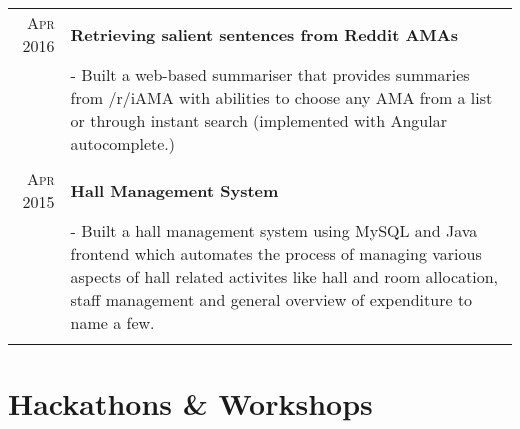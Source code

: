 \documentclass[a4paper,10pt]{extarticle} %
\begin{document}
\begin{tabular}{r|p{17cm}}
\textsc{Apr 2016} & \textbf{Retrieving salient sentences from Reddit AMAs} \\
& \footnotesize{- Built a web-based summariser that provides summaries from /r/iAMA with abilities to choose any AMA from a list or through instant search (implemented with Angular autocomplete.)}\\
\multicolumn{2}{c}{} \\

\textsc{Apr 2015} & \textbf{Hall Management System}\\
& \footnotesize{- Built a hall management system using MySQL and Java frontend which automates the process of managing various aspects of hall related activites like hall and room allocation, staff management and general overview of expenditure to name a few.}\\
\multicolumn{2}{c}{} \\
\end{tabular}

\section{Hackathons \& Workshops}
\end{document}
